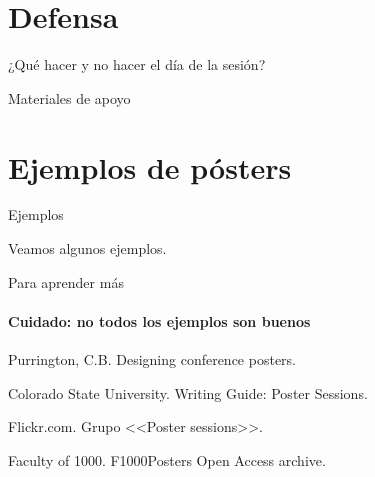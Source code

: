 \documentclass[xcolor=svgnames,compress]{beamer}
\begin{document}
\section{Defensa}

\begin{frame}{¿Qué hacer y no hacer el día de la sesión?}

\end{frame}

\begin{frame}{Materiales de apoyo}


\end{frame}

\section[Ejemplos]{Ejemplos de pósters}
\label{sec:posters}

\begin{frame}{Ejemplos}
  \begin{center}
    \Large Veamos algunos ejemplos.
  \end{center}
\end{frame}

\appendix

\begin{frame}{Para aprender más}
  \framesubtitle{Cuidado: no todos los ejemplos son buenos}

  \begin{thebibliography}{10}
    \beamertemplatearticlebibitems
     Purrington, C.B.
      \newblock Designing conference posters.

     Colorado State University.
      \newblock Writing Guide: Poster Sessions.

     Flickr.com.
      \newblock Grupo <<Poster sessions>>.

     Faculty of 1000.
      \newblock F1000Posters Open Access archive.
  \end{thebibliography}
\end{frame}
\end{document}
